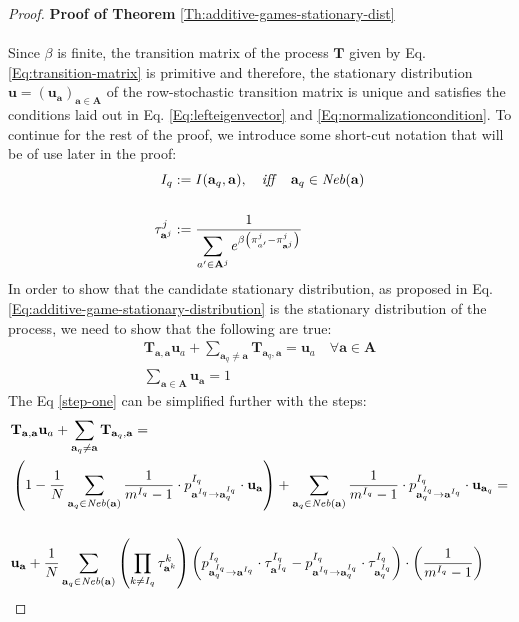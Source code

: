 \documentclass[11pt]{article}
\theoremstyle{plainCl1}
\theoremstyle{plainCl2}
\newcommand{\A}{\mathbf{A}}
\newcommand{\abf}{\mathbf{a}}
\newcommand{\T}{\mathbf{T}}
\newcommand{\ubf}{\mathbf{u}}
\begin{document}
\begin{proof}
\textbf{Proof of Theorem} \ref{Th:additive-games-stationary-dist} \\ \\ 
Since $\beta$ is finite, the transition matrix of the process $\T$ given by Eq. \ref{Eq:transition-matrix} is primitive and therefore, the stationary distribution $\ubf = (\ubf_\abf)_{\abf \in \A}$ of the row-stochastic transition matrix is unique and satisfies the conditions laid out in Eq. \ref{Eq:lefteigenvector} and \ref{Eq:normalizationcondition}. To continue for the rest of the proof, we introduce some short-cut notation that will be of use later in the proof:\\
\begin{align}
I_{q} &:= I(\abf_q,\abf), \quad \mathit{iff} \quad \abf_q \in \mathit{Neb}(\abf) \\ \notag \\ 
\label{Eq:shortcut-tau}
\tau^j_{\abf^j} &:= \frac{1}{\displaystyle \sum_{a' \in \A^j} e^{\beta \left( \pi^j_{a'} -  \pi^j_{\abf^j} \right) }} 
\end{align}
\noindent In order to show that the candidate stationary distribution, as proposed in Eq. \ref{Eq:additive-game-stationary-distribution} is the stationary distribution of the process, we need to show that the following are true:
\begin{eqnarray}
\label{step-one}
\T_{\abf,\abf} \ubf_a  + \sum_{\abf_q \neq \abf} \T_{\abf_q, \abf} = \ubf_a \quad \forall \abf \in \A \\ 
\label{step-two}
\sum_{\abf \in \A} \ubf_\abf  = 1
\end{eqnarray}
The Eq \ref{step-one} can be simplified further with the steps: 
\begin{align}
&\T_{\abf,\abf} \ubf_a  + \sum_{\abf_q \neq \abf} \T_{\abf_q, \abf} = \\
& \left( 1 - \frac{1}{N} \sum_{\abf_q \in \mathit{Neb}(\abf)} \frac{1}{m^{I_q}-1} \cdot p^{I_q}_{\abf^{I_q} \to \abf^{I_q}_q} \cdot \ubf_{\abf} \right) + \sum_{\abf_q \in \mathit{Neb}(\abf)}  \frac{1}{m^{I_q}-1} \cdot p^{I_q}_{\abf^{I_q}_q \to \abf^{I_q}} \cdot \ubf_{\abf_q} = \\ \notag \\
\label{eq:important-step}
& \ubf_\abf +  \frac{1}{N} \sum_{\abf_q \in \mathit{Neb}(\abf)} \left( \prod_{k \neq I_q} \tau^k_{\abf^k} \right) \left( p^{I_q}_{\abf^{I_q}_q \to \abf^{I_q}} \cdot \tau^{I_q}_{\abf^{I_q}} -  p^{I_q}_{\abf^{I_q} \to \abf^{I_q}_q} \cdot \tau^{I_q}_{\abf^{I_q}_q} \right) \cdot \left(  \frac{1}{m^{I_q}-1} \right)

\end{align}
\end{proof}
\end{document}
